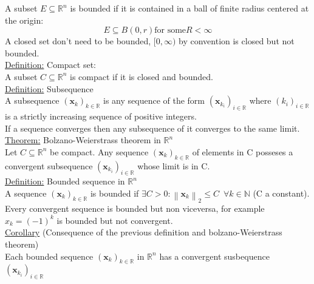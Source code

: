\documentclass[a4paper,11pt]{article}
\renewcommand{\mod}[1]{
  \left\lVert {#1}\right\rVert_2
}
\newcommand{\rn}{
  \mathbb{R}^n
}
\newcommand{\R}{
  \mathbb{R}
}
\begin{document}
A subset $ E \subseteq \mathbb{R}^n $ is bounded if it is contained in a ball of finite radius centered at the origin: 
$$ E \subseteq B(0,r) \text{for some} R < \infty $$
A closed set don't need to be bounded, $ [0,\infty) $ by convention is closed but not bounded. \\
\underline{Definition:} Compact set: \\
A subset $ C \subseteq \rn $ is compact if it is closed and bounded. \\
\underline{Definition:} Subsequence \\
A subsequence $ \left(\mathbf{x}_k\right)_{k \in \R} $ is any sequence of the form $ \left(\mathbf{x}_{k_i}\right)_{i \in \R} $ where $\left(k_i\right)_{i \in \R} $ is a strictly increasing sequence of positive integers. \\
If a sequence converges then any subsequence of it converges to the same limit. \\
\underline{Theorem:} Bolzano-Weierstrass theorem in $\rn$ \\
Let $C \subseteq \rn $ be compact. Any sequence $ \left(\mathbf{x}_k\right)_{k \in \R} $ of elements in C posseses a convergent subsequence $ \left(\mathbf{x}_{k_i}\right)_{i \in \R}$ whose limit is  in C. \\
\underline{Definition:} Bounded sequence in $\rn$ \\
A sequence $ \left(\mathbf{x}_k\right)_{k \in \R} $  is bounded if $\exists C > 0 : \mod{\mathbf{x}_k} \leq C \, \, \, \forall k \in \mathbb{N} $ (C a constant). \\
Every convergent sequence is bounded but non viceversa, for example $ x_k = \left(-1\right)^k $ is bounded but not convergent. \\ 
\underline{Corollary} (Consequence of the previous definition and bolzano-Weierstrass theorem) \\
Each bounded sequence $ \left(\mathbf{x}_k\right)_{k \in \R}  $ in $\rn$ has a convergent susbequence $ \left(\mathbf{x}_{k_i}\right)_{i \in \R} $ \\
\end{document}
